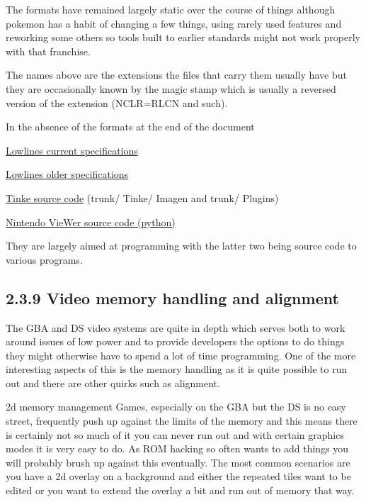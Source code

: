 \documentclass[
]{book}
\begin{document}
The formats have remained largely static over the course of things although pokemon has a habit of changing a few things, using rarely used features and reworking some others so tools built to earlier standards might not work properly with that franchise.

The names above are the extensions the files that carry them usually have but they are occasionally known by the magic stamp which is usually a reversed version of the extension (NCLR=RLCN and such).

In the absence of the formats at the end of the document

\href{http://llref.emutalk.net/docs/}{Lowlines current specifications}

\href{http://www.romhacking.net/documents/469/}{Lowlines older specifications}

\href{https://github.com/pleonex/tinke/tree/master/Tinke}{Tinke source code} (trunk/ Tinke/ Imagen and trunk/ Plugins)

\href{http://nvwr.googlecode.com/svn/trunk/libs/formats/}{Nintendo VieWer source code (python)}

They are largely aimed at programming with the latter two being source code to various programs.

\hypertarget{video-memory-handling-and-alignment}{%
\subsection{2.3.9 Video memory handling and alignment}\label{video-memory-handling-and-alignment}}

The GBA and DS video systems are quite in depth which serves both to work around issues of low power and to provide developers the options to do things they might otherwise have to spend a lot of time programming. One of the more interesting aspects of this is the memory handling as it is quite possible to run out and there are other quirks such as alignment.

2d memory management Games, especially on the GBA but the DS is no easy street, frequently push up against the limits of the memory and this means there is certainly not so much of it you can never run out and with certain graphics modes it is very easy to do. As ROM hacking so often wants to add things you will probably brush up against this eventually. The most common scenarios are you have a 2d overlay on a background and either the repeated tiles want to be edited or you want to extend the overlay a bit and run out of memory that way.
\end{document}
